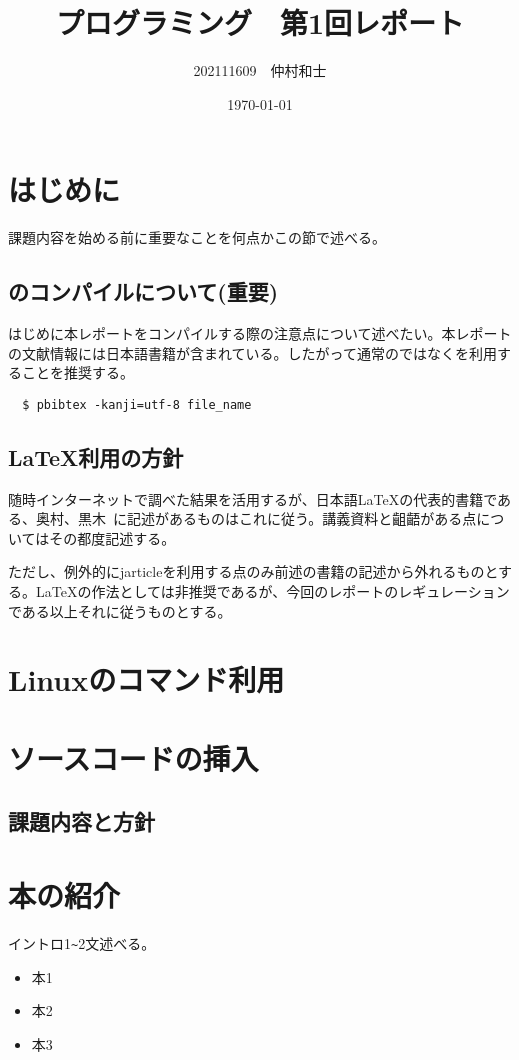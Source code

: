 \documentclass[dvipdfmx,twocolumn,12pt]{jarticle}
\title{プログラミング　第1回レポート}
\author{202111609　仲村和士}
\date{\today}
\begin{document}
\maketitle
\section{はじめに}
課題内容を始める前に重要なことを何点かこの節で述べる。

\subsection{\BibTeX のコンパイルについて(重要)}
はじめに本レポートをコンパイルする際の注意点について述べたい。本レポートの文献情報には日本語書籍が含まれている。したがって通常の\BibTeX ではなく\pBibTeX を利用することを推奨する。
\begin{verbatim}
  $ pbibtex -kanji=utf-8 file_name
\end{verbatim}

\subsection{\LaTeX 利用の方針}
随時インターネットで調べた結果を活用するが、日本語\LaTeX の代表的書籍である、奥村、黒木~\cite{bibunsho}に記述があるものはこれに従う。講義資料と齟齬がある点についてはその都度記述する。

ただし、例外的にjarticleを利用する点のみ前述の書籍の記述から外れるものとする。\LaTeX の作法としては非推奨であるが、今回のレポートのレギュレーションである以上それに従うものとする。

\section{Linuxのコマンド利用}

\section{ソースコードの挿入}
\subsection{課題内容と方針}

\section{本の紹介}
イントロ1\verb+~+2文述べる。
\begin{itemize}
  \item 本1 \cite{bibunsho}
  \item 本2
  \item 本3
\end{itemize}



\end{document}
